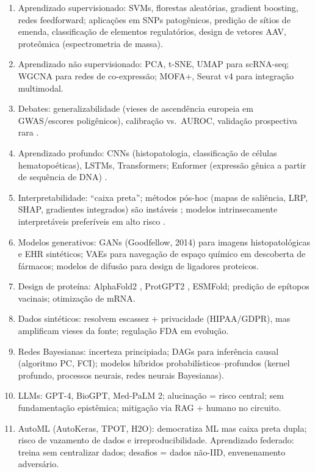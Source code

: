 \clearpage
\begin{revise}\small
\begin{enumerate}[itemsep=0pt, topsep=0pt, parsep=0pt]
    \item Aprendizado supervisionado: SVMs, florestas aleatórias, gradient boosting, redes feedforward; aplicações em SNPs patogênicos, predição de sítios de emenda, classificação de elementos regulatórios, design de vetores AAV, proteômica (espectrometria de massa).
    \item Aprendizado não supervisionado: PCA, t-SNE, UMAP para scRNA-seq; WGCNA para redes de co-expressão; MOFA+, Seurat v4 para integração multimodal.
    \item Debates: generalizabilidade (vieses de ascendência europeia em GWAS/escores poligênicos), calibração vs.\ AUROC, validação prospectiva rara \parencite{popejoy2016,obermeyer2019}.
    \item Aprendizado profundo: CNNs (histopatologia, classificação de células hematopoéticas), LSTMs, Transformers; Enformer (expressão gênica a partir de sequência de DNA) \parencite{avsec2021}.
    \item Interpretabilidade: ``caixa preta''; métodos pós-hoc (mapas de saliência, LRP, SHAP, gradientes integrados) são instáveis \parencite{adebayo2018}; modelos intrinsecamente interpretáveis preferíveis em alto risco \parencite{rudin2019}.
    \item Modelos generativos: GANs (Goodfellow, 2014) para imagens histopatológicas e EHR sintéticos; VAEs para navegação de espaço químico em descoberta de fármacos; modelos de difusão para design de ligadores proteicos.
    \item Design de proteína: AlphaFold2 \parencite{jumper2021}, ProtGPT2 \parencite{ferruz2022}, ESMFold; predição de epítopos vacinais; otimização de mRNA.
    \item Dados sintéticos: resolvem escassez + privacidade (HIPAA/GDPR), mas amplificam vieses da fonte; regulação FDA em evolução.
    \item Redes Bayesianas: incerteza principiada; DAGs para inferência causal (algoritmo PC, FCI); modelos híbridos probabilísticos--profundos (kernel profundo, processos neurais, redes neurais Bayesianas).
    \item LLMs: GPT-4, BioGPT, Med-PaLM 2; alucinação = risco central; sem fundamentação epistêmica; mitigação via RAG + humano no circuito.
    \item AutoML (AutoKeras, TPOT, H2O): democratiza ML mas caixa preta dupla; risco de vazamento de dados e irreproducibilidade. Aprendizado federado: treina sem centralizar dados; desafios = dados não-IID, envenenamento adversário.
\end{enumerate}
\end{revise}

\clearpage

\printbibliography[heading=subbibliography,title={Referências}]

